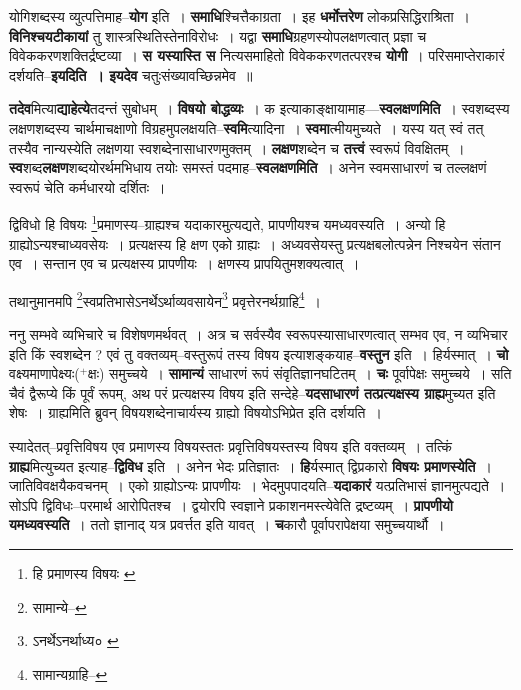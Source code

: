 \documentclass[article,12pt,a4paper]{memoir}
\newcommand{\add}[1]{($^{+}$#1)}
\begin{document}
	  \pstart योगिशब्दस्य व्युत्पत्तिमाह--\textbf{योग} इति । \textbf{समाधि}श्चित्तैकाग्रता । इह \textbf{धर्मोत्तरेण} लोकप्रसिद्धिराश्रिता । \textbf{विनिश्चयटीकायां} तु शास्त्रस्थितिस्तेनाविरोधः । यद्वा \textbf{समाधि}ग्रहणस्योपलक्षणत्वात् प्रज्ञा च विवेककरणशक्तिर्द्रष्टव्या । \textbf{स यस्यास्ति स} नित्यसमाहितो विवेककरणतत्परश्च \textbf{योगी} । परिसमाप्तेराकारं दर्शयति--\textbf{इयदिति । इयदेव} चतुःसंख्यावच्छिन्नमेव ॥
	\pend
      

	  \pstart \textbf{तदेव}मित्या\textbf{द्याहेत्ये}तदन्तं सुबोधम् । \textbf{विषयो बोद्धव्यः} । क इत्याकाङ्क्षायामाह—\textbf{स्वलक्षणमिति} । स्वशब्दस्य लक्षणशब्दस्य चार्थमाचक्षाणो विग्रहमुपलक्षयति--\textbf{स्वमि}त्यादिना । \textbf{स्वमा}त्मीयमुच्यते । यस्य यत् स्वं तत् तस्यैव नान्यस्येति लक्षणया स्वशब्देनासाधारणमुक्तम् । \textbf{लक्षण}शब्देन च \textbf{तत्त्वं} स्वरूपं विवक्षितम् । \textbf{स्व}शब्द\textbf{लक्षण}शब्दयोरर्थमभिधाय तयोः समस्तं पदमाह--\textbf{स्वलक्षणमिति} । अनेन स्वमसाधारणं च तल्लक्षणं स्वरूपं चेति कर्मधारयो दर्शितः ।
	\pend
      \leavevmode{}
	  \bigskip
	  \begingroup
	

	  \pstart द्विविधो हि विषयः \footnote{हि प्रमाणस्य विषयः \cite{dp-msA} \cite{dp-edP} \cite{dp-edH} \cite{dp-edN}}प्रमाणस्य--ग्राह्यश्च यदाकारमुत्यद्यते, प्रापणीयश्च यमध्यवस्यति । अन्यो हि ग्राह्योऽन्यश्चाध्यवसेयः । प्रत्यक्षस्य हि क्षण एको ग्राह्यः । अध्यवसेयस्तु प्रत्यक्षबलोत्पन्नेन निश्चयेन संतान एव । सन्तान एव च प्रत्यक्षस्य प्रापणीयः । क्षणस्य प्रापयितुमशक्यत्वात् ।
	\pend
       

	  \pstart तथानुमानमपि \footnote{सामान्ये--\cite{dp-msD-n}}स्वप्रतिभासेऽनर्थेऽर्थाव्यवसायेन\footnote{ऽनर्थेऽनर्थाध्य० \cite{dp-msA} \cite{dp-edP} \cite{dp-edH}} प्रवृत्तेरनर्थग्राहि\footnote{सामान्यग्राहि--\cite{dp-msD-n}} ।
	\pend
      
	  \endgroup
	

	  \pstart ननु सम्भवे व्यभिचारे च विशेषणमर्थवत् । अत्र च सर्वस्यैव स्वरूपस्यासाधारणत्वात् सम्भव एव, न व्यभिचार इति किं स्वशब्देन ? एवं तु वक्तव्यम्--वस्तुरूपं तस्य विषय इत्याशङ्कयाह--\textbf{वस्तुन} इति । हिर्यस्मात् । \textbf{चो} वक्ष्यमाणापेक्ष्यः\add{क्षः} समुच्चये । \textbf{सामान्यं} साधारणं रूपं संवृतिज्ञानघटितम् । \textbf{चः} पूर्वापेक्षः समुच्चये । सति चैवं द्वैरूप्ये किं पूर्वं रूपम्, अथ परं प्रत्यक्षस्य विषय इति सन्देहे--\textbf{यदसाधारणं तत्प्रत्यक्षस्य ग्राह्य}मुच्यत इति शेषः । ग्राह्यमिति ब्रुवन् विषयशब्देनाचार्यस्य ग्राह्यो विषयोऽभिप्रेत इति दर्शयति ।
	\pend
      

	  \pstart स्यादेतत्--प्रवृत्तिविषय एव प्रमाणस्य विषयस्ततः प्रवृत्तिविषयस्तस्य विषय इति वक्तव्यम् । तत्किं \textbf{ग्राह्य}मित्युच्यत इत्याह--\textbf{द्विविध} इति । अनेन भेदः प्रतिज्ञातः । \textbf{हि}र्यस्मात् द्विप्रकारो \textbf{विषयः प्रमाणस्येति} । जातिविवक्षयैकवचनम् । एको ग्राह्योऽन्यः प्रापणीयः । भेदमुपपादयति--\textbf{यदाकारं} यत्प्रतिभासं ज्ञानमुत्पद्यते । सोऽपि द्विविधः--परमार्थ आरोपितश्च । द्वयोरपि स्वज्ञाने प्रकाशनमस्त्येवेति द्रष्टव्यम् । \textbf{प्रापणीयो यमध्यवस्यति} । ततो ज्ञानाद् यत्र प्रवर्त्तत इति यावत् । \textbf{च}कारौ पूर्वापरापेक्षया समुच्चयार्थौ ।
	\pend
      
\end{document}
